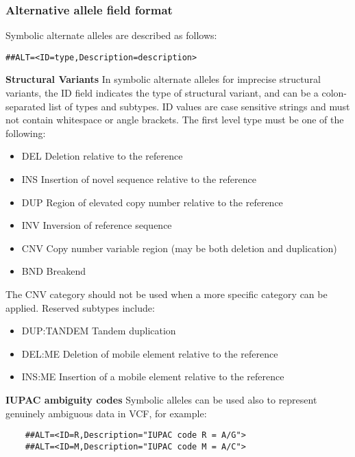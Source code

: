 \documentclass[8pt]{article}
\begin{document}
\subsubsection{Alternative allele field format}
Symbolic alternate alleles are described as follows:
\begin{verbatim}
##ALT=<ID=type,Description=description>
\end{verbatim}

\noindent \textbf{Structural Variants} \newline
In symbolic alternate alleles for imprecise structural variants, the ID field indicates the type of structural variant, and can be a colon-separated list of types and subtypes.
ID values are case sensitive strings and must not contain whitespace or angle brackets.
The first level type must be one of the following:
\begin{itemize}
  \item DEL Deletion relative to the reference
  \item INS Insertion of novel sequence relative to the reference
  \item DUP Region of elevated copy number relative to the reference
  \item INV Inversion of reference sequence
  \item CNV Copy number variable region (may be both deletion and duplication)
  \item BND Breakend
\end{itemize}

The CNV category should not be used when a more specific category can be applied. Reserved subtypes include:
\begin{itemize}
  \item DUP:TANDEM Tandem duplication
  \item DEL:ME Deletion of mobile element relative to the reference
  \item INS:ME Insertion of a mobile element relative to the reference
\end{itemize}

\bigskip

\noindent \textbf{IUPAC ambiguity codes} \newline
Symbolic alleles can be used also to represent genuinely ambiguous data in VCF, for example:
\begin{verbatim}
    ##ALT=<ID=R,Description="IUPAC code R = A/G">
    ##ALT=<ID=M,Description="IUPAC code M = A/C">
\end{verbatim}
\end{document}
